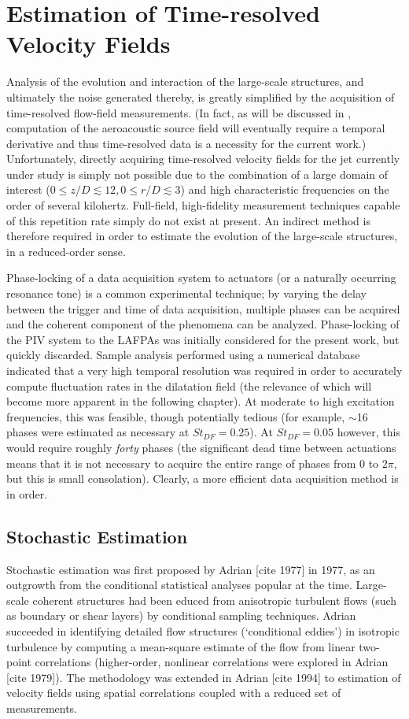 \chapter{Estimation of Time-resolved Velocity Fields}
Analysis of the evolution and interaction of the large-scale structures, and ultimately the noise generated thereby, is greatly simplified by the acquisition of time-resolved flow-field measurements.
(In fact, as will be discussed in , computation of the aeroacoustic source field will eventually require a temporal derivative and thus time-resolved data is a necessity for the current work.)
Unfortunately, directly acquiring time-resolved velocity fields for the jet currently under study is simply not possible due to the combination of a large domain of interest ($0 \leq z/D \lesssim 12, 0 \leq r/D \lesssim 3$) and high characteristic frequencies on the order of several kilohertz.
Full-field, high-fidelity measurement techniques capable of this repetition rate simply do not exist at present.
An indirect method is therefore required in order to estimate the evolution of the large-scale structures, in a reduced-order sense.

Phase-locking of a data acquisition system to actuators (or a naturally occurring resonance tone) is a common experimental technique; by varying the delay between the trigger and time of data acquisition, multiple phases can be acquired and the coherent component of the phenomena can be analyzed.
Phase-locking of the PIV system to the LAFPAs was initially considered for the present work, but quickly discarded.
Sample analysis performed using a numerical database indicated that a very high temporal resolution was required in order to accurately compute fluctuation rates in the dilatation field (the relevance of which will become more apparent in the following chapter).
At moderate to high excitation frequencies, this was feasible, though potentially tedious (for example, $\sim$16 phases were estimated as necessary at $St_{DF} =0.25$).
At $St_{DF} =0.05$ however, this would require roughly \textit{forty} phases (the significant dead time between actuations means that it is not necessary to acquire the entire range of phases from $0$ to $2\pi$, but this is small consolation).
Clearly, a more efficient data acquisition method is in order.
\section{Stochastic Estimation}
Stochastic estimation was first proposed by Adrian [cite 1977] in 1977, as an outgrowth from the conditional statistical analyses popular at the time. 
Large-scale coherent structures had been educed from anisotropic turbulent flows (such as boundary or shear layers) by conditional sampling techniques.
Adrian succeeded in identifying detailed flow structures (`conditional eddies') in isotropic turbulence by computing a mean-square estimate of the flow from linear two-point correlations (higher-order, nonlinear correlations were explored in Adrian [cite 1979]). 
The methodology was extended in Adrian [cite 1994] to estimation of velocity fields using spatial correlations coupled with a reduced set of measurements.

